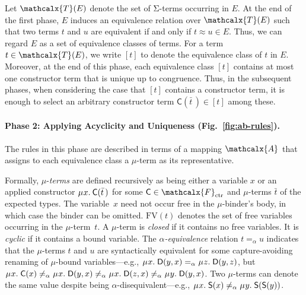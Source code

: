 \documentclass[smallcondensed,draft]{svjour3}
\newcommand\MU{\vvthinspace\mu\vvthinspace}
\newcommand\FV{\mathrm{FV}}
\newcommand\Sig{\mathrm{\Sigma}}
\newcommand\const[1]{\textsf{#1}}
\renewcommand{\vec}[1]{\bar #1}
\newcommand{\Ec}{E}
\newcommand{\tEc}{\Terms(\Ec)}
\newcommand{\rn}[1]{\textsf{#1}}
\newcommand{\teq}{\approx}
\newcommand{\ec}[1]{[#1]}
\newcommand{\Val}{\mathcalx{A}\vvthinspace}
\newcommand{\aequiv}{\mathrel{=_\alpha}}
\newcommand\Terms{\mathcalx{T}}
\newcommand\Funcs{\mathcalx{F}}
\newcommand\Ctr{\Funcs_{\smash{\mathrm{ctr}}}}
\newcommand\vvthinspace{\kern+0.041667em}
\begin{document}
Let $\tEc$ denote the set of $\Sig$-terms occurring in $\Ec$.
At the end of the first phase, $\Ec$ induces an equivalence
relation over $\tEc$ such that two terms $t$ and $u$ are equivalent if and
only if $t \teq u \in \Ec$.
Thus, we can regard $\Ec$ as a set of
equivalence classes of terms. For a term $t \in \tEc$, we write $\ec{t}$ to
denote the equivalence class of $t$ in $\Ec$.
Moreover, at the end of this phase, each equivalence class $\ec{t}$ contains
at most %
one constructor term that is unique up to congruence.
Thus, in the subsequent phases, 
when considering the case that $\ec{t}$ contains a constructor term,
it is enough %
to select an arbitrary constructor term $\const{C}( \vec t\, ) \in \ec{t}$ among these.

\paragraph{Phase 2: Applying Acyclicity and Uniqueness \rm(Fig.~\ref{fig:ab-rules}).}
The rules in this phase are described in terms of a mapping $\Val$
that assigns to each equivalence class a $\mu$-term as its representative.

Formally, $\mu$-\emph{terms} are defined recursively as being either a variable $x$
or an applied constructor
$\MU x.\: \const{C}( \vec t\, )$ for some $\const{C} \in \Ctr$ and
$\mu$-terms $\vec t$ of the expected types.
The variable~$x$ need not occur free in the $\mu$-binder's body, in which case
the binder can be omitted.
$\FV( t )$ denotes the set of free variables occurring in the $\mu$-term~$t$.
A $\mu$-term is \emph{closed} if %
it contains no free variables. It is \emph{cyclic} if %
it contains a bound variable. The $\alpha$\emph{-equiv\-alence} relation $t \aequiv u$
indicates that the $\mu$-terms $t$ and $u$
are syntactically equivalent for some capture-avoiding renaming of $\mu$-bound variables---e.g.,
$\MU x.\; \const{D}( y, x ) \aequiv \MU z.\; \const{D}( y, z )$,
but
$\MU x.\; \const{C}( x ) \not\aequiv \MU x.\; \const{D}( y, x ) \not\aequiv \MU x.\; \const{D}( z, x )
\not\aequiv \MU y.\; \const{D}( y, x )$.
Two $\mu$-terms can denote the same value despite being $\alpha$-disequivalent---e.g.,
$\MU x.\; \const{S}( x ) \not\aequiv \MU y.\; \const{S}( \const{S}( y ) )$.
\end{document}
